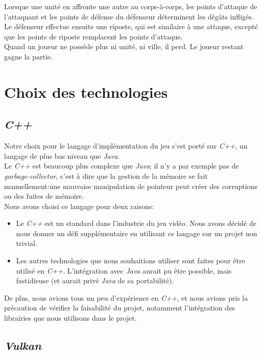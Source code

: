 \documentclass[french]{article}
\begin{document}
Lorsque une unité en affronte une autre au corps-à-corps, les points d'attaque de l'attaquant et les points de défense du défenseur déterminent les dégâts infligés. Le défenseur effectue ensuite une riposte, qui est similaire à une attaque, excepté que les points de riposte remplacent les points d'attaque.\\

Quand un joueur ne possède plus ni unité, ni ville, il perd. Le joueur restant gagne la partie.

\section{Choix des technologies}

\subsection{\textit{C++}}

Notre choix pour le langage d'implémentation du jeu s'est porté sur \textit{C++}, un langage de plus bas niveau que \textit{Java}.\\
Le \textit{C++} est beaucoup plus complexe que \textit{Java}; il n'y a par exemple pas de \textit{garbage-collector}, c'est à dire que la gestion de la mémoire se fait manuellement:une mauvaise manipulation de pointeur peut créer des corruptions ou des fuites de mémoire.\\

Nous avons choisi ce langage pour deux raisons:

\begin{itemize}
	\item Le \textit{C++} est un standard dans l'industrie du jeu vidéo. Nous avons décidé de nous donner un défi supplémentaire en utilisant ce langage sur un projet non trivial.
	\item Les autres technologies que nous souhaitions utiliser sont faites pour être utilisé en \textit{C++}. L'intégration avec \textit{Java} aurait pu être possible, mais fastidieuse (et aurait privé \textit{Java} de sa portabilité).
\end{itemize}

De plus, nous avions tous un peu d'expérience en \textit{C++}, et nous avions pris la précaution de vérifier la faisabilité du projet, notamment l'intégration des librairies que nous utilisons dans le projet.

\subsection{\textit{Vulkan}}
\end{document}
